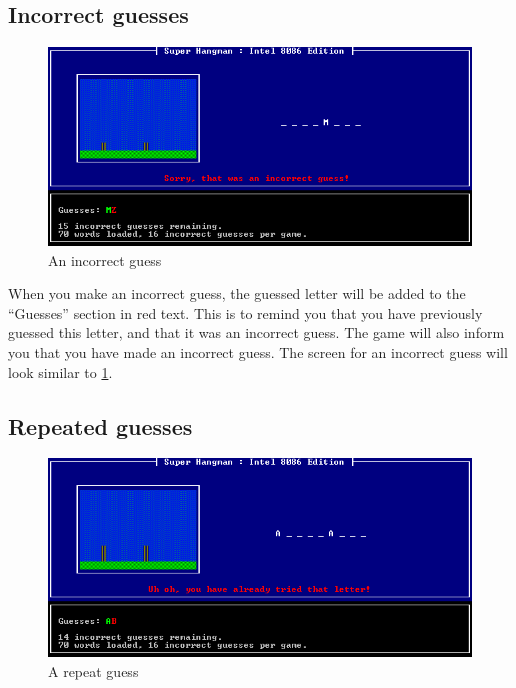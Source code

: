 \subsection{Incorrect guesses}

\begin{figure}[h]
\includegraphics[scale=0.5]{incorrect_guess}

\caption{\label{fig:An-incorrect-guess}An incorrect guess}


\end{figure}


When you make an incorrect guess, the guessed letter will be added
to the ``Guesses'' section in red text. This is to remind you that
you have previously guessed this letter, and that it was an incorrect
guess. The game will also inform you that you have made an incorrect
guess. The screen for an incorrect guess will look similar to \ref{fig:An-incorrect-guess}.


\subsection{Repeated guesses}

\begin{figure}[h]
\includegraphics[scale=0.5]{repeat_guess}

\caption{\label{fig:A-repeat-guess}A repeat guess}


\end{figure}



